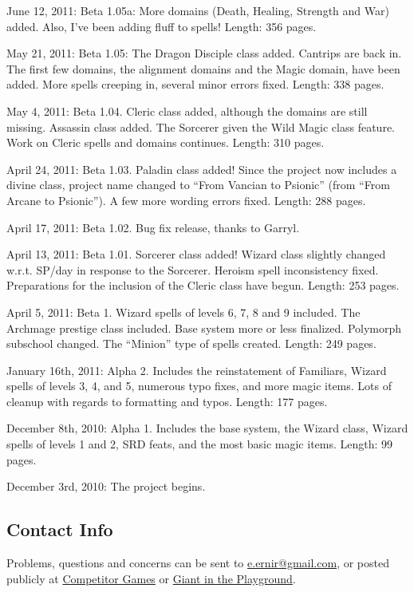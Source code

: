\begin{list}{}{\leftmargin=1em}
 \item June 12, 2011: Beta 1.05a: More domains (Death, Healing, Strength and War) added.
 Also, I've been adding fluff to spells! Length: 356 pages.
 \item May 21, 2011: Beta 1.05: The Dragon Disciple class added. Cantrips are back in. The first few domains, the alignment domains and the Magic domain, have been added.
 More spells creeping in, several minor errors fixed. Length: 338 pages.
 \item May 4, 2011: Beta 1.04. Cleric class added, although the domains are still missing.
 Assassin class added. The Sorcerer given the Wild Magic class feature. Work on Cleric spells and domains continues.
 Length: 310 pages.
 \item April 24, 2011: Beta 1.03. Paladin class added! Since the project now includes a divine class, project name changed to ``From Vancian to Psionic''
 (from ``From Arcane to Psionic''). A few more wording errors fixed. Length: 288 pages.
 \item April 17, 2011: Beta 1.02. Bug fix release, thanks to Garryl.
 \item April 13, 2011: Beta 1.01. Sorcerer class added! Wizard class slightly changed w.r.t. SP/day in response to the Sorcerer. Heroism spell inconsistency fixed.
 Preparations for the inclusion of the Cleric class have begun.
 Length: 253 pages.
 \item April 5, 2011: Beta 1. Wizard spells of levels 6, 7, 8 and 9 included. The Archmage prestige class included.
 Base system more or less finalized. Polymorph subschool changed. The ``Minion'' type of spells created.
 Length: 249 pages.
 \item January 16th, 2011: Alpha 2. Includes the reinstatement of Familiars, Wizard spells of levels 3, 4, and 5, numerous typo fixes, and more magic items.
 Lots of cleanup with regards to formatting and typos. Length: 177 pages.
 \item December 8th, 2010: Alpha 1. Includes the base system, the Wizard class, Wizard spells of levels 1 and 2, SRD feats,
 and the most basic magic items. Length: 99 pages.
 \item December 3rd, 2010: The project begins.
\end{list}
\subsection{Contact Info}
Problems, questions and concerns can be sent to
\href{mailto:e.ernir@gmail.com}{e.ernir@gmail.com}, or posted publicly at \href{http://forum.faxcelestis.net/viewtopic.php?f=1&t=186&sid=8991c93e2a863857ec84c4674df8481b}{Competitor Games}
or \href{http://www.giantitp.com/forums/showthread.php?t=194002}{Giant in the Playground}.
